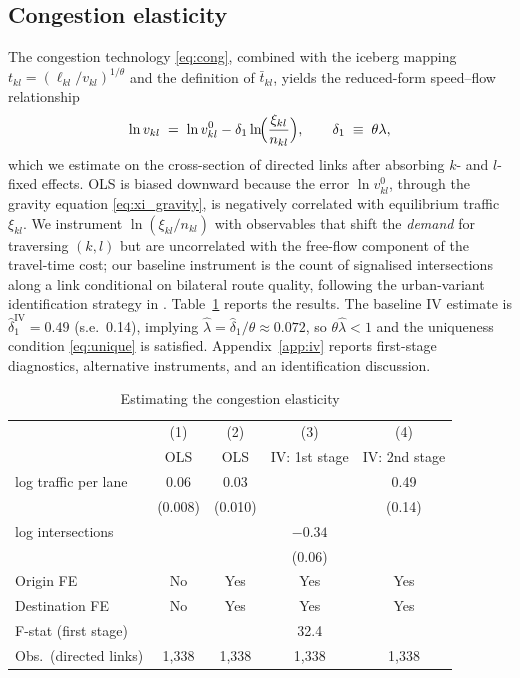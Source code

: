 \documentclass[12pt]{article}
\newcommand{\tbar}{\bar t}
\newcommand{\tkl}{t_{kl}}
\begin{document}
\subsection{Congestion elasticity}\label{ssec:lambda}

The congestion technology \eqref{eq:cong}, combined with the iceberg
mapping $\tkl=(\ell_{kl}/v_{kl})^{1/\theta}$ and the definition of
$\tbar_{kl}$, yields the reduced-form speed--flow relationship
\begin{equation}
  \ln v_{kl}\;=\;\ln v^{0}_{kl}
  -\delta_1\ln\!\Bigl(\frac{\xi_{kl}}{n_{kl}}\Bigr),
  \qquad
  \delta_1\;\equiv\;\theta\lambda,
  \label{eq:speed_flow}
\end{equation}
which we estimate on the cross-section of directed links after
absorbing $k$- and $l$-fixed effects.  OLS is biased downward because
the error $\ln v^{0}_{kl}$, through the gravity equation
\eqref{eq:xi_gravity}, is negatively correlated with equilibrium
traffic $\xi_{kl}$.  We instrument $\ln(\xi_{kl}/n_{kl})$ with
observables that shift the \emph{demand} for traversing $(k,l)$ but
are uncorrelated with the free-flow component of the travel-time
cost; our baseline instrument is the count of signalised intersections
along a link conditional on bilateral route quality, following the
urban-variant identification strategy in \citet{AllenArkolakis2022}.
Table~\ref{tab:lambda} reports the results.  The baseline IV estimate
is $\hat\delta_1^{\mathrm{IV}}=0.49$ (s.e.\ 0.14), implying
$\hat\lambda=\hat\delta_1/\theta\approx0.072$, so $\theta\hat\lambda
<1$ and the uniqueness condition \eqref{eq:unique} is satisfied.
Appendix~\ref{app:iv} reports first-stage diagnostics, alternative
instruments, and an identification discussion.

\begin{table}[H]
\centering
\caption{Estimating the congestion elasticity}
\label{tab:lambda}
\begin{tabular}{lcccc}
\toprule
 & (1) & (2) & (3) & (4) \\
 & OLS & OLS & IV: 1st stage & IV: 2nd stage\\
\midrule
log traffic per lane & 0.06 & 0.03 & & 0.49\\
 & (0.008) & (0.010) & & (0.14)\\
log intersections & & & $-0.34$ & \\
 & & & (0.06) & \\
\midrule
Origin FE   & No  & Yes & Yes & Yes\\
Destination FE & No & Yes & Yes & Yes\\
F-stat (first stage) & & & 32.4 & \\
Obs.\ (directed links) & 1{,}338 & 1{,}338 & 1{,}338 & 1{,}338\\
\bottomrule
\end{tabular}
\end{table}
\end{document}

